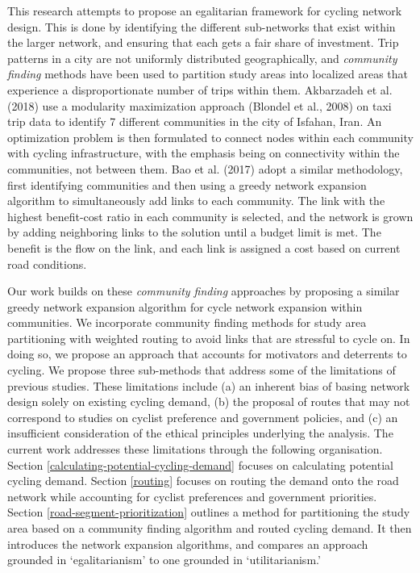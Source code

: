 \documentclass[
]{article}
\begin{document}
This research attempts to propose an egalitarian framework for cycling
network design. This is done by identifying the different sub-networks
that exist within the larger network, and ensuring that each gets a fair
share of investment. Trip patterns in a city are not uniformly
distributed geographically, and \emph{community finding} methods have been
used to partition study areas into localized areas that experience a
disproportionate number of trips within them. Akbarzadeh et al. (2018)
use a modularity maximization approach (Blondel et al., 2008) on taxi trip
data to identify 7 different communities in the city of Isfahan, Iran.
An optimization problem is then formulated to connect nodes within each
community with cycling infrastructure, with the emphasis being on
connectivity within the communities, not between them. Bao et al. (2017)
adopt a similar methodology, first identifying communities and then
using a greedy network expansion algorithm to simultaneously add links
to each community. The link with the highest benefit-cost ratio in each
community is selected, and the network is grown by adding neighboring
links to the solution until a budget limit is met. The benefit is the
flow on the link, and each link is assigned a cost based on current road
conditions.

Our work builds on these \emph{community finding} approaches by proposing a
similar greedy network expansion algorithm for cycle network expansion
within communities. We incorporate community finding methods for study
area partitioning with weighted routing to avoid links that are
stressful to cycle on. In doing so, we propose an approach that
accounts for motivators and deterrents to cycling. We propose three
sub-methods that address some of the limitations of previous
studies. These limitations include (a) an inherent bias of basing network
design solely on existing cycling demand, (b) the proposal of routes that may
not correspond to studies on cyclist preference and government policies,
and (c) an insufficient consideration of the ethical principles underlying
the analysis. The current work addresses these limitations through the following organisation. Section \ref{calculating-potential-cycling-demand}
focuses on calculating potential cycling demand. Section \ref{routing}
focuses on routing the demand onto the road network while accounting for
cyclist preferences and government priorities. Section
\ref{road-segment-prioritization} outlines a method for partitioning the
study area based on a community finding algorithm and routed cycling
demand. It then introduces the network expansion algorithms, and compares an approach grounded in
`egalitarianism' to one grounded in `utilitarianism.'
\end{document}
